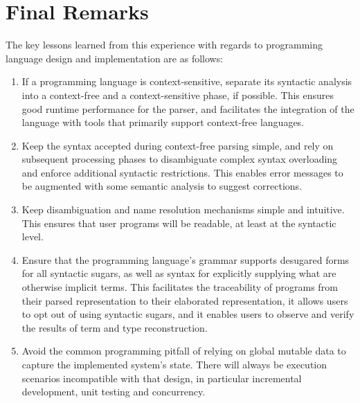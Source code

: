 \section{Final Remarks}

The key lessons learned from this experience with regards to programming language design and implementation are as follows:

\begin{enumerate}
\item
If a programming language is context-sensitive, separate its syntactic analysis into a context-free and a context-sensitive phase, if possible.
This ensures good runtime performance for the parser, and facilitates the integration of the language with tools that primarily support context-free languages.
\item
Keep the syntax accepted during context-free parsing simple, and rely on subsequent processing phases to disambiguate complex syntax overloading and enforce additional syntactic restrictions.
This enables error messages to be augmented with some semantic analysis to suggest corrections.
\item
Keep disambiguation and name resolution mechanisms simple and intuitive.
This ensures that user programs will be readable, at least at the syntactic level.
\item
Ensure that the programming language's grammar supports desugared forms for all syntactic sugars, as well as syntax for explicitly supplying what are otherwise implicit terms.
This facilitates the traceability of programs from their parsed representation to their elaborated representation, it allows users to opt out of using syntactic sugars, and it enables users to observe and verify the results of term and type reconstruction.
\item
Avoid the common programming pitfall of relying on global mutable data to capture the implemented system's state.
There will always be execution scenarios incompatible with that design, in particular incremental development, unit testing and concurrency.
\end{enumerate}
